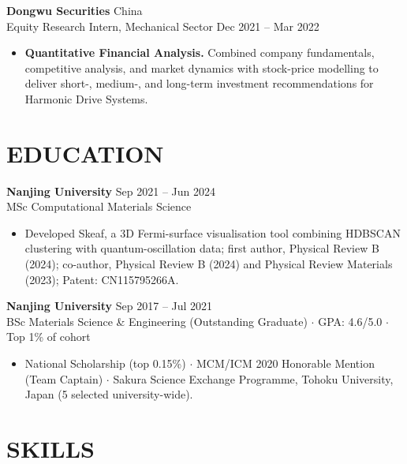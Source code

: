 \documentclass[a4paper,10pt]{article}
\begin{document}
\vspace{2pt}
\noindent\textbf{Dongwu Securities} \hfill China\\
Equity Research Intern, Mechanical Sector \hfill Dec 2021 -- Mar 2022
\begin{itemize}
    \item \textbf{Quantitative Financial Analysis.} Combined company fundamentals, competitive analysis, and market dynamics with stock-price modelling to deliver short-, medium-, and long-term investment recommendations for Harmonic Drive Systems.
\end{itemize}

\section{EDUCATION}

\noindent\textbf{Nanjing University} \hfill Sep 2021 -- Jun 2024\\
MSc Computational Materials Science
\begin{itemize}
    \item Developed Skeaf, a 3D Fermi-surface visualisation tool combining HDBSCAN clustering with quantum-oscillation data; first author, Physical Review B (2024); co-author, Physical Review B (2024) and Physical Review Materials (2023); Patent: CN115795266A.
\end{itemize}

\vspace{2pt}
\noindent\textbf{Nanjing University} \hfill Sep 2017 -- Jul 2021\\
BSc Materials Science \& Engineering (Outstanding Graduate) \;$\cdot$\; GPA: 4.6/5.0 \;$\cdot$\; Top 1\% of cohort
\begin{itemize}
    \item National Scholarship (top 0.15\%) \;$\cdot$\; MCM/ICM 2020 Honorable Mention (Team Captain) \;$\cdot$\; Sakura Science Exchange Programme, Tohoku University, Japan (5 selected university-wide).
\end{itemize}

\section{SKILLS}
\end{document}
